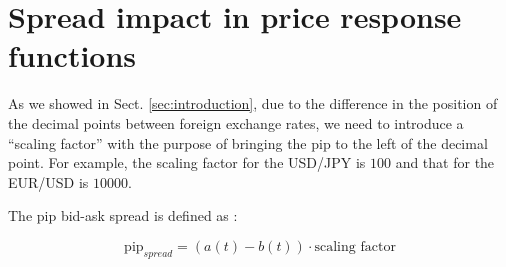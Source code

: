 \section{Spread impact in price response functions}\label{sec:spread_impact}


As we showed in Sect. \ref{sec:introduction}, due to the difference in the position of the decimal
points between foreign exchange rates, we need to introduce a ``scaling factor''
with the purpose of bringing the pip to the left of the decimal point.
For example, the scaling factor for the USD/JPY is $100$ and that for the
EUR/USD is $10000$.

The pip bid-ask spread is defined as \cite{micro_eff}:

\begin{equation}
    \text{pip}_{spread} = \left(a\left(t\right) - b\left(t\right)\right) \cdot \text{scaling factor}
\end{equation}
